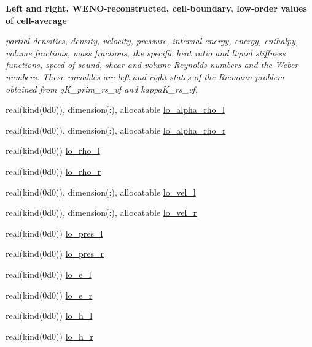 \begin{Indent}\textbf{ Left and right, W\+E\+N\+O-\/reconstructed, cell-\/boundary, low-\/order values of cell-\/average}\par
{\em partial densities, density, velocity, pressure, internal energy, energy, enthalpy, volume fractions, mass fractions, the specific heat ratio and liquid stiffness functions, speed of sound, shear and volume Reynolds numbers and the Weber numbers. These variables are left and right states of the Riemann problem obtained from q\+K\+\_\+prim\+\_\+rs\+\_\+vf and kappa\+K\+\_\+rs\+\_\+vf. }\begin{DoxyCompactItemize}
\item 
real(kind(0d0)), dimension(\+:), allocatable \hyperlink{namespacem__riemann__solvers_ad1c29f933978f01c9402ad5287abdfe6}{lo\+\_\+alpha\+\_\+rho\+\_\+l}
\item 
real(kind(0d0)), dimension(\+:), allocatable \hyperlink{namespacem__riemann__solvers_a3874a511fdd71a444bfcc9193103e148}{lo\+\_\+alpha\+\_\+rho\+\_\+r}
\item 
real(kind(0d0)) \hyperlink{namespacem__riemann__solvers_ac99e69e03846f742aa0ce5e228d5167f}{lo\+\_\+rho\+\_\+l}
\item 
real(kind(0d0)) \hyperlink{namespacem__riemann__solvers_a81537cffcfd4fb575ffaffdc1ed64028}{lo\+\_\+rho\+\_\+r}
\item 
real(kind(0d0)), dimension(\+:), allocatable \hyperlink{namespacem__riemann__solvers_ae939a1e2f36044a0729480d09e05d74f}{lo\+\_\+vel\+\_\+l}
\item 
real(kind(0d0)), dimension(\+:), allocatable \hyperlink{namespacem__riemann__solvers_acf54d997ef4105fd507c180db700c873}{lo\+\_\+vel\+\_\+r}
\item 
real(kind(0d0)) \hyperlink{namespacem__riemann__solvers_ab0807a312841bf144ff78338bf11a89b}{lo\+\_\+pres\+\_\+l}
\item 
real(kind(0d0)) \hyperlink{namespacem__riemann__solvers_a8ac4fca37ee46e90e61ca83a1e4eb2c5}{lo\+\_\+pres\+\_\+r}
\item 
real(kind(0d0)) \hyperlink{namespacem__riemann__solvers_abf27be79fc84bb7830520e08774fd56c}{lo\+\_\+e\+\_\+l}
\item 
real(kind(0d0)) \hyperlink{namespacem__riemann__solvers_a7596585d3504d397f16723b6a6ffd862}{lo\+\_\+e\+\_\+r}
\item 
real(kind(0d0)) \hyperlink{namespacem__riemann__solvers_a75cca68e31742083e0ebbef418300c78}{lo\+\_\+h\+\_\+l}
\item 
real(kind(0d0)) \hyperlink{namespacem__riemann__solvers_a985a98321338d51bc8a43695b490b102}{lo\+\_\+h\+\_\+r}

\end{DoxyCompactItemize}
\end{Indent}
